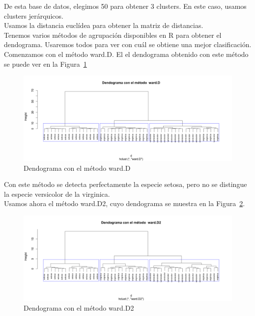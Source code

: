 \documentclass[12pt,a4paper,twoside,openright,titlepage,final]{article}
\begin{document}
De esta base de datos, elegimos 50 para obtener 3 clusters. En este caso, usamos clusters jerárquicos.\\

Usamos la distancia euclídea para obtener la matriz de distancias.\\

Tenemos varios métodos de agrupación disponibles en R para obtener el dendograma. Usaremos todos para ver con cuál se obtiene una mejor clasificación.\\

Comenzamos con el método ward.D. El el dendograma obtenido con este método se puede ver en la Figura~\ref{fig:dendograma_ward.D}\\

\begin{figure}[tbph!]
\centering
\includegraphics[width=0.9\linewidth]{imagenes/dendograma_wardD}
\caption{Dendograma con el método ward.D}
\label{fig:dendograma_ward.D}
\end{figure}

Con este método se detecta perfectamente la especie setosa, pero no se distingue la especie versicolor de la virginica.\\

Usamos ahora el método ward.D2, cuyo dendograma se muestra en la Figura~\ref{fig:dendograma_ward.D2}.\\

\begin{figure}[tbph!]
\centering
\includegraphics[width=0.9\linewidth]{imagenes/dendograma_wardD2}
\caption{Dendograma con el método ward.D2}
\label{fig:dendograma_ward.D2}
\end{figure}
\end{document}
